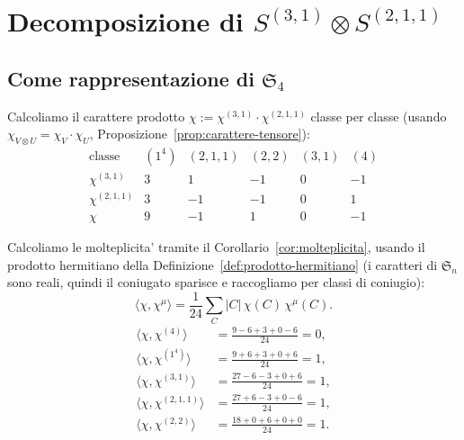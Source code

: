 
\section{Decomposizione di $ S^{(3,1)} \otimes S^{(2,1,1)} $}

\subsection{Come rappresentazione di $ \mathfrak{S}_4 $}

Calcoliamo il carattere prodotto $ \chi := \chi^{(3,1)} \cdot \chi^{(2,1,1)} $ classe per classe
(usando $ \chi_{V \otimes U} = \chi_V \cdot \chi_U $, Proposizione~\ref{prop:carattere-tensore}):
\[
  \begin{array}{c|cccccc}
    \text{classe} & (1^4) & (2,1,1) & (2,2) & (3,1) & (4) \\ \hline
    \chi^{(3,1)} & 3 & 1 & -1 & 0 & -1 \\
    \chi^{(2,1,1)} & 3 & -1 & -1 & 0 & 1 \\
    \chi & 9 & -1 & 1 & 0 & -1
  \end{array}
\]

Calcoliamo le molteplicita' tramite il Corollario~\ref{cor:molteplicita}, usando il prodotto
hermitiano della Definizione~\ref{def:prodotto-hermitiano} (i caratteri di $ \mathfrak{S}_n $
sono reali, quindi il coniugato sparisce e raccogliamo per classi di coniugio):
\[
  \langle \chi, \chi^\mu \rangle = \frac{1}{24} \sum_C |C|\, \chi(C)\, \chi^\mu(C).
\]
\begin{align*}
  \langle \chi, \chi^{(4)} \rangle &= \tfrac{9 - 6 + 3 + 0 - 6}{24} = 0, \\
  \langle \chi, \chi^{(1^4)} \rangle &= \tfrac{9 + 6 + 3 + 0 + 6}{24} = 1, \\
  \langle \chi, \chi^{(3,1)} \rangle &= \tfrac{27 - 6 - 3 + 0 + 6}{24} = 1, \\
  \langle \chi, \chi^{(2,1,1)} \rangle &= \tfrac{27 + 6 - 3 + 0 - 6}{24} = 1, \\
  \langle \chi, \chi^{(2,2)} \rangle &= \tfrac{18 + 0 + 6 + 0 + 0}{24} = 1.
\end{align*}

